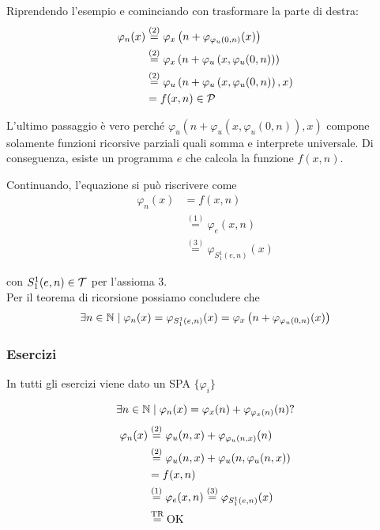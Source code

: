Riprendendo l'esempio e cominciando con trasformare la parte di destra:
\begin{align*}
	\varphi_n (x) & \stackrel{(2)}{=} \varphi_x \left(n + \varphi_{\varphi_u (0,n)} (x)\right) \\
	& \stackrel{(2)}{=} \varphi_x \left(n + \varphi_u \left(x, \varphi_u (0,n)\right)\right) \\
	& \stackrel{(2)}{=} \varphi_u \left(n + \varphi_u \left(x, \varphi_u (0,n)\right), x\right) \\
	& = f(x,n) \in \mathcal{P}
\end{align*}

\vspace{-1em}

L'ultimo passaggio è vero perché $\varphi_u \left(n + \varphi_u \left(x, \varphi_u (0,n)\right), x\right)$ compone solamente funzioni ricorsive parziali quali somma e interprete universale. Di conseguenza, esiste un programma $e$ che calcola la funzione $f(x,n)$.

Continuando, l'equazione si può riscrivere come
\begin{align*}
	\varphi_n (x) & = f(x,n) \\
	& \stackrel{(1)}{=} \varphi_e (x,n) \\
	& \stackrel{(3)}{=} \varphi_{S_1^1 (e,n)} (x)
\end{align*}

con $S_1^1 (e,n) \in \mathcal{T}$ per l'assioma 3.\\

Per il teorema di ricorsione possiamo concludere che
$$ \exists n \in \mathbb{N} \mid \varphi_n (x) = \varphi_{S^1_1 (e,n)} (x) = \varphi_x \left(n + \varphi_{\varphi_u (0,n)} (x)\right) $$

\subsubsection{Esercizi}

In tutti gli esercizi viene dato un SPA $\{\varphi_i\}$

$$ \exists n \in \mathbb{N} \mid \varphi_n (x) = \varphi_x (n) + \varphi_{\varphi_x (n)} (n)? $$
\begin{align*}
	\varphi_n (x) & \stackrel{(2)}{=} \varphi_u (n,x) + \varphi_{\varphi_u (n,x)} (n) \\
	& \stackrel{(2)}{=} \varphi_u (n,x) + \varphi_u (n, \varphi_u (n,x)) \\
	& = f(x,n) \\
	& \stackrel{(1)}{=} \varphi_e (x,n) \stackrel{(3)}{=} \varphi_{S^1_1 (e,n)} (x) \\
	& \stackrel{\text{TR}}{=} \text{OK}
\end{align*}


